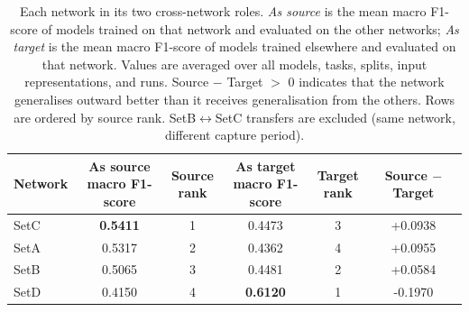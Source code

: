 \begin{table}[htbp]
\caption{Each network in its two cross-network roles. \textit{As source} is the mean macro F1-score of models trained on that network and evaluated on the other networks; \textit{As target} is the mean macro F1-score of models trained elsewhere and evaluated on that network. Values are averaged over all models, tasks, splits, input representations, and runs. Source $-$ Target $>$ 0 indicates that the network generalises outward better than it receives generalisation from the others. Rows are ordered by source rank. SetB$\leftrightarrow$SetC transfers are excluded (same network, different capture period).}
\label{tab:q4_roles}
\centering
\begin{tabular}{lccccc}
\toprule
Network & \makecell{As source \\ macro F1-score} & \makecell{Source \\ rank} & \makecell{As target \\ macro F1-score} & \makecell{Target \\ rank} & Source $-$ Target \\
\midrule
SetC & \textbf{0.5411} & 1 & 0.4473 & 3 & +0.0938 \\
SetA & 0.5317 & 2 & 0.4362 & 4 & +0.0955 \\
SetB & 0.5065 & 3 & 0.4481 & 2 & +0.0584 \\
SetD & 0.4150 & 4 & \textbf{0.6120} & 1 & -0.1970 \\
\bottomrule
\end{tabular}
\end{table}
